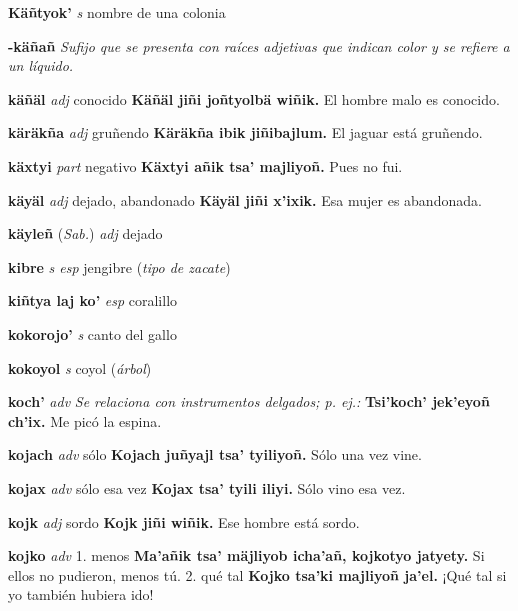 \documentclass[10pt]{scrbook}
\newcommand{\entry}[1]{\textbf{#1}}
\newcommand{\onedefinition}[1]{#1.}
\newcommand{\nontranslationdef}[1]{\textit{#1}}
\newcommand{\partofspeech}[1]{\textit{#1}}
\newcommand{\spanishtranslation}[1]{#1}
\newcommand{\clarification}[1]{(\textit{#1})}
\newcommand{\cholexample}[1]{\textbf{#1}}
\newcommand{\exampletranslation}[1]{#1}
\newcommand{\relevantdialect}[1]{(\textit{#1})}
\begin{document}
\begin{multicols}{2}
\entry{Käñtyok'}
\partofspeech{s}
\spanishtranslation{nombre de una colonia}

\entry{-käñañ}
\nontranslationdef{Sufijo que se presenta con raíces adjetivas que indican color y se refiere a un líquido.}

\entry{käñäl}
\partofspeech{adj}
\spanishtranslation{conocido}
\cholexample{Käñäl jiñi joñtyolbä wiñik.}
\exampletranslation{El hombre malo es conocido.}

\entry{käräkña}
\partofspeech{adj}
\spanishtranslation{gruñendo}
\cholexample{Käräkña ibik jiñibajlum.}
\exampletranslation{El jaguar está gruñendo.}

\entry{käxtyi}
\partofspeech{part}
\spanishtranslation{negativo}
\cholexample{Käxtyi añik tsa' majliyoñ.}
\exampletranslation{Pues no fui.}

\entry{käyäl}
\partofspeech{adj}
\spanishtranslation{dejado, abandonado}
\cholexample{Käyäl jiñi x'ixik.}
\exampletranslation{Esa mujer es abandonada.}

\entry{käyleñ}
\relevantdialect{Sab.}
\partofspeech{adj}
\spanishtranslation{dejado}

\entry{kibre}
\partofspeech{s esp}
\spanishtranslation{jengibre}
\clarification{tipo de zacate}

\entry{kiñtya laj ko'}
\partofspeech{esp}
\spanishtranslation{coralillo}

\entry{kokorojo'}
\partofspeech{s}
\spanishtranslation{canto del gallo}

\entry{kokoyol}
\partofspeech{s}
\spanishtranslation{coyol}
\clarification{árbol}

\entry{koch'}
\partofspeech{adv}
\nontranslationdef{Se relaciona con instrumentos delgados; p. ej.:}
\cholexample{Tsi'koch' jek'eyoñ ch'ix.}
\exampletranslation{Me picó la espina.}

\entry{kojach}
\partofspeech{adv}
\spanishtranslation{sólo}
\cholexample{Kojach juñyajl tsa' tyiliyoñ.}
\exampletranslation{Sólo una vez vine.}

\entry{kojax}
\partofspeech{adv}
\spanishtranslation{sólo esa vez}
\cholexample{Kojax tsa' tyili iliyi.}
\exampletranslation{Sólo vino esa vez.}

\entry{kojk}
\partofspeech{adj}
\spanishtranslation{sordo}
\cholexample{Kojk jiñi wiñik.}
\exampletranslation{Ese hombre está sordo.}

\entry{kojko}
\partofspeech{adv}
\onedefinition{1}
\spanishtranslation{menos}
\cholexample{Ma'añik tsa' mäjliyob icha'añ, kojkotyo jatyety.}
\exampletranslation{Si ellos no pudieron, menos tú.}
\onedefinition{2}
\spanishtranslation{qué tal}
\cholexample{Kojko tsa'ki majliyoñ ja'el.}
\exampletranslation{¡Qué tal si yo también hubiera ido!}


\end{multicols}
\end{document}

